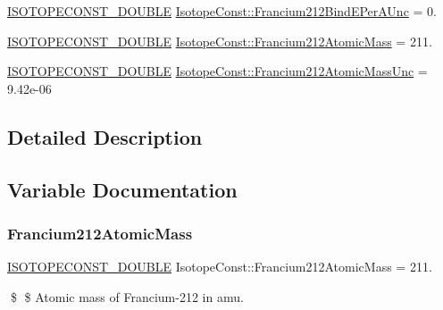 \begin{DoxyCompactItemize}
\mbox{\hyperlink{group___isotope_const-_macros_ga8f45a7272ce02c0b4c65c44636ed719a}{I\+S\+O\+T\+O\+P\+E\+C\+O\+N\+S\+T\+\_\+\+D\+O\+U\+B\+LE}} \mbox{\hyperlink{group___isotope_const-_francium-_fr212_ga7812c5cff709b599cb176c7bb0544e86}{Isotope\+Const\+::\+Francium212\+Bind\+E\+Per\+A\+Unc}} = 0.
\item 
\mbox{\hyperlink{group___isotope_const-_macros_ga8f45a7272ce02c0b4c65c44636ed719a}{I\+S\+O\+T\+O\+P\+E\+C\+O\+N\+S\+T\+\_\+\+D\+O\+U\+B\+LE}} \mbox{\hyperlink{group___isotope_const-_francium-_fr212_gaaba79db53038e931fd9497a1bd54681f}{Isotope\+Const\+::\+Francium212\+Atomic\+Mass}} = 211.
\item 
\mbox{\hyperlink{group___isotope_const-_macros_ga8f45a7272ce02c0b4c65c44636ed719a}{I\+S\+O\+T\+O\+P\+E\+C\+O\+N\+S\+T\+\_\+\+D\+O\+U\+B\+LE}} \mbox{\hyperlink{group___isotope_const-_francium-_fr212_gac2f577c0309e3141d3467c2f255b8d1e}{Isotope\+Const\+::\+Francium212\+Atomic\+Mass\+Unc}} = 9.\+42e-\/06
\end{DoxyCompactItemize}


\subsection{Detailed Description}


\subsection{Variable Documentation}
\mbox{\label{group___isotope_const-_francium-_fr212_gaaba79db53038e931fd9497a1bd54681f}} 
\subsubsection{\texorpdfstring{Francium212\+Atomic\+Mass}{Francium212AtomicMass}}
{\footnotesize\ttfamily \mbox{\hyperlink{group___isotope_const-_macros_ga8f45a7272ce02c0b4c65c44636ed719a}{I\+S\+O\+T\+O\+P\+E\+C\+O\+N\+S\+T\+\_\+\+D\+O\+U\+B\+LE}} Isotope\+Const\+::\+Francium212\+Atomic\+Mass = 211.}

\$ \$ Atomic mass of Francium-\/212 in amu. \mbox{\label{group___isotope_const-_francium-_fr212_gac2f577c0309e3141d3467c2f255b8d1e}} 
